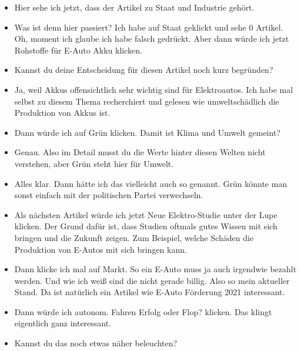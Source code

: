 {\begin{itemize}[]
              Gut, dann gucken wir mal, ob sich ein E-Auto wirklich lohnt.
              Also klicke ich mal auf den Artikel \flqq Stromverbrauch: So viel verbraucht ein E-Auto wirklich\frqq{}.
        \item {} Hier sehe ich jetzt, dass der Artikel zu Staat und Industrie gehört.
        \item {} Was ist denn hier passiert?
              Ich habe auf Staat geklickt und sehe 0 Artikel.
              Oh, moment ich glaube ich habe falsch gedrückt.
              Aber dann würde ich jetzt \flqq Rohstoffe für E-Auto Akku\frqq{} klicken.
        \item {} Kannst du deine Entscheidung für diesen Artikel noch kurz begründen?
        \item {} Ja, weil Akkus offensichtlich sehr wichtig sind für Elektroautos.
              Ich habe mal selbst zu diesem Thema recherchiert und gelesen wie umweltschädlich die Produktion von Akkus ist.
        \item {} Dann würde ich auf Grün klicken. Damit ist Klima und Umwelt gemeint?
        \item {} Genau. Also im Detail musst du die Werte hinter diesen Welten nicht verstehen, aber Grün steht hier für Umwelt.
        \item {} Alles klar. Dann hätte ich das vielleicht auch so genannt.
              Grün könnte man sonst einfach mit der politischen Partei verwechseln.
        \item {} Als nächsten Artikel würde ich jetzt \flqq Neue Elektro-Studie unter der Lupe\frqq{} klicken.
              Der Grund dafür ist, dass Studien oftmals gutes Wissen mit sich bringen und die Zukunft zeigen.
              Zum Beispiel, welche Schäden die Produktion von E-Autos mit sich bringen kann.
        \item {} Dann klicke ich mal auf Markt.
              So ein E-Auto muss ja auch irgendwie bezahlt werden.
              Und wie ich weiß sind die nicht gerade billig.
              Also so mein aktueller Stand.
              Da ist natürlich ein Artikel wie \flqq E-Auto Förderung 2021\frqq{} interessant.
        \item {} Dann würde ich \flqq autonom. Fahren Erfolg oder Flop?\frqq{} klicken.
              Das klingt eigentlich ganz interessant.
        \item {} Kannst du das noch etwas näher beleuchten?

\end{itemize}}
